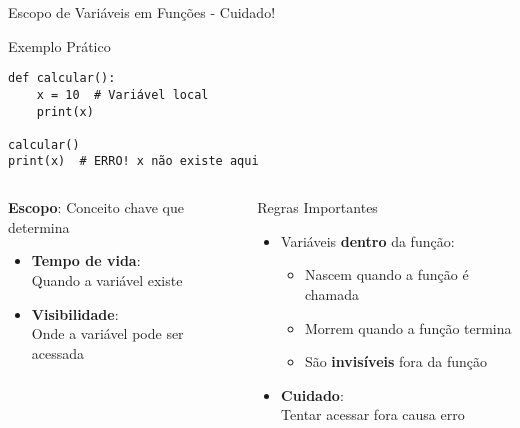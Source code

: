 \begin{frame}[fragile]{Escopo de Variáveis em Funções - Cuidado!}
    \begin{exampleblock}{Exemplo Prático}
\begin{verbatim}
def calcular():
    x = 10  # Variável local
    print(x)

calcular()
print(x)  # ERRO! x não existe aqui
\end{verbatim}
    \end{exampleblock}
\begin{columns}[T]
    \begin{block}{\textbf{Escopo}: Conceito chave que  determina}
        
        \begin{itemize}
            \item \textbf{Tempo de vida}:\\ Quando a variável existe
            \item \textbf{Visibilidade}:\\ Onde a variável pode ser acessada
        \end{itemize}
    \end{block}


    \begin{alertblock}{Regras Importantes}
        \begin{itemize}
            \item Variáveis \textbf{dentro} da função:
            \begin{itemize}
                \item Nascem quando a função é chamada
                \item Morrem quando a função termina
                \item São \textbf{invisíveis} fora da função
            \end{itemize}
            \item \textbf{Cuidado}:\\ Tentar acessar fora causa erro
        \end{itemize}
    \end{alertblock}


\end{columns}


\end{frame}


